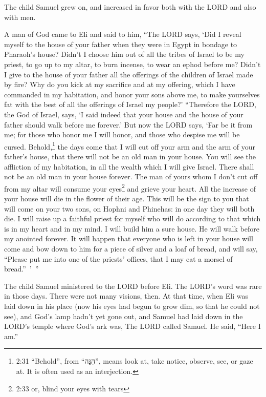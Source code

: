 \myverse{}The child Samuel grew on, and increased in favor both with the
LORD and also with men.

\myverse{}A man of God came to Eli and said to him, “The LORD says, ‘Did
I reveal myself to the house of your father when they were in Egypt in bondage to Pharaoh’s house?
\myverse{}Didn’t I choose him out of all the tribes of Israel to be my priest, to go
up to my altar, to burn incense, to wear an ephod before me? Didn’t I give to the house of your father
all the offerings of the children of Israel made by fire?
\myverse{}Why do you kick at my sacrifice and at my offering, which I have commanded
in my habitation, and honor your sons above me, to make yourselves fat with the best of all the offerings
of Israel my people?’
\myverse{}“Therefore the LORD, the God of Israel, says, ‘I said indeed that your house
and the house of your father should walk before me forever.’ But now the LORD says, ‘Far be it from me;
for those who honor me I will honor, and those who despise me will be cursed.
\myverse{}Behold,\footnote{2:31 “Behold”, from “הִנֵּה”, means look at, take notice, observe, see, or gaze at. It is
	often used as an interjection.} the days come that I will cut off your arm and the arm of your
father’s house, that there will not be an old man in your house.
\myverse{}You will see the affliction of my habitation, in all the wealth which I will
give Israel. There shall not be an old man in your house forever.
\myverse{}The man of yours whom I don’t cut off from my altar will consume your eyes\footnote{2:33 or, blind your eyes with tears} and grieve your heart. All the increase of your house
will die in the flower of their age.
\myverse{}This will be the sign to you that will come on your two sons, on Hophni and
Phinehas: in one day they will both die.
\myverse{}I will raise up a faithful priest for myself who will do according to that
which is in my heart and in my mind. I will build him a sure house. He will walk before my anointed forever.
\myverse{}It will happen that everyone who is left in your house will come and bow down
to him for a piece of silver and a loaf of bread, and will say, “Please put me into one of the priests’
offices, that I may eat a morsel of bread.” ’ ”


\mychapter{} \myverse*{}The child Samuel ministered to the LORD before Eli. The LORD’s
word was rare in those days. There were not many visions, then.
\myverse{}At that time, when Eli was laid down in his place (now his eyes had begun to
grow dim, so that he could not see),
\myverse{}and God’s lamp hadn’t yet gone out, and Samuel had laid down in the LORD’s temple
where God’s ark was,
\myverse{}The LORD called Samuel. He said, “Here I am.”

